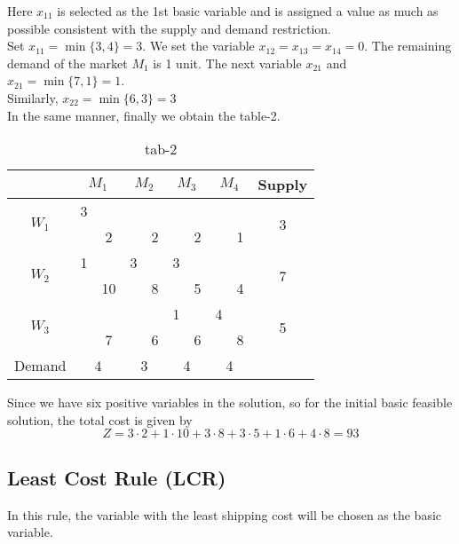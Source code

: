 \documentclass[../main-sheet.tex]{subfiles}
\begin{document}
Here \(x_{11}\) is selected as the 1st basic variable and is assigned a value as much as possible consistent with the supply and demand restriction.\\
Set \(x_{11}=\min\{3,4\}=3\). We set the variable \(x_{12}=x_{13}=x_{14}=0\). The remaining demand of the market \(M_1\) is 1 unit. The next variable \(x_{21}\) and \(x_{21}=\min\{7,1\}=1\).\\
Similarly, \(x_{22}=\min\{6,3\}=3\)\\
In the same manner, finally we obtain the table-2.
\begin{table}[H]
    \centering
    \begin{tabular}{|c|cc|cc|cc|cc|c|}
    \hline
     & \multicolumn{2}{c|}{$M_1$} & \multicolumn{2}{c|}{$M_2$} & \multicolumn{2}{c|}{$M_3$} & \multicolumn{2}{c|}{$M_4$} & Supply \\[2pt] \hline
    \multirow{2}{*}{$W_1$} & 3 &  &  &  &  &  &  &  & \multirow{2}{*}{3} \\ \cline{3-3} \cline{5-5} \cline{7-7} \cline{9-9}
     & \multicolumn{1}{c|}{} & 2 & \multicolumn{1}{c|}{} & 2 & \multicolumn{1}{c|}{} & 2 & \multicolumn{1}{c|}{} & 1 &  \\ \hline
    \multirow{2}{*}{$W_2$} & 1 &  & 3 &  & 3 &  &  &  & \multirow{2}{*}{7} \\ \cline{3-3} \cline{5-5} \cline{7-7} \cline{9-9}
     & \multicolumn{1}{c|}{} & 10 & \multicolumn{1}{c|}{} & 8 & \multicolumn{1}{c|}{} & 5 & \multicolumn{1}{c|}{} & 4 &  \\ \hline
    \multirow{2}{*}{$W_3$} &  &  &  &  & 1 &  & 4 &  & \multirow{2}{*}{5} \\ \cline{3-3} \cline{5-5} \cline{7-7} \cline{9-9}
     & \multicolumn{1}{c|}{} & 7 & \multicolumn{1}{c|}{} & 6 & \multicolumn{1}{c|}{} & 6 & \multicolumn{1}{c|}{} & 8 &  \\ \hline
    Demand & \multicolumn{2}{c|}{4} & \multicolumn{2}{c|}{3} & \multicolumn{2}{c|}{4} & \multicolumn{2}{c|}{4} &  \\[2pt] \hline
    \end{tabular}
    \caption{tab-2}
\end{table}
Since we have six positive variables in the solution, so for the initial basic feasible solution, the total cost is given by
\[
    Z=3\cdot2+1\cdot10+3\cdot8+3\cdot5+1\cdot6+4\cdot8=93
\]
\subsection{Least Cost Rule (LCR)}
In this rule, the variable with the least shipping cost will be chosen as the basic variable.
\end{document}
